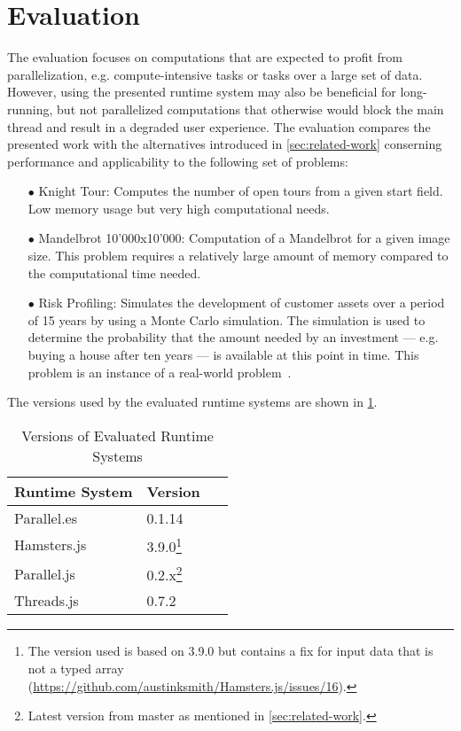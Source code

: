 \section{Evaluation}\label{sec:evaluation}
The evaluation focuses on computations that are expected to profit from parallelization, e.g. compute-intensive tasks or tasks over a large set of data. However, using the presented runtime system may also be beneficial for long-running, but not parallelized computations that otherwise would block the main thread and result in a degraded user experience. The evaluation compares the presented work with the alternatives introduced in \cref{sec:related-work} conserning performance and applicability to the following set of problems:

\begin{itemize}
	\item[$\bullet$] Knight Tour: Computes the number of open tours from a given start field. Low memory usage but very high computational needs.
	\item[$\bullet$] Mandelbrot 10'000x10'000: Computation of a Mandelbrot for a given image size. This problem requires a relatively large amount of memory compared to the computational time needed.
	\item[$\bullet$] Risk Profiling: Simulates the development of customer assets over a period of 15 years by using a Monte Carlo simulation. The simulation is used to determine the probability that the amount needed by an investment --- e.g. buying a house after ten years --- is available at this point in time. This problem is an instance of a real-world problem~\cite{Kwsoft2016}.
\end{itemize}

The versions used by the evaluated runtime systems are shown in \cref{tab:runtime-system-version}.

\begin{table}
	\centering
	\begin{tabular}{p{0.6\linewidth} l}
		\toprule
		Runtime System & Version \\ \midrule
		Parallel.es & 0.1.14 \\
		Hamsters.js & 3.9.0\footnote{The version used is based on 3.9.0 but contains a fix for input data that is not a typed array (\url{https://github.com/austinksmith/Hamsters.js/issues/16}).} \\
		Parallel.js & 0.2.x\footnote{Latest version from master as mentioned in \cref{sec:related-work}.} \\
		Threads.js & 0.7.2 \\ \bottomrule
	\end{tabular}
	\caption{Versions of Evaluated Runtime Systems}
	\label{tab:runtime-system-version}
\end{table}


